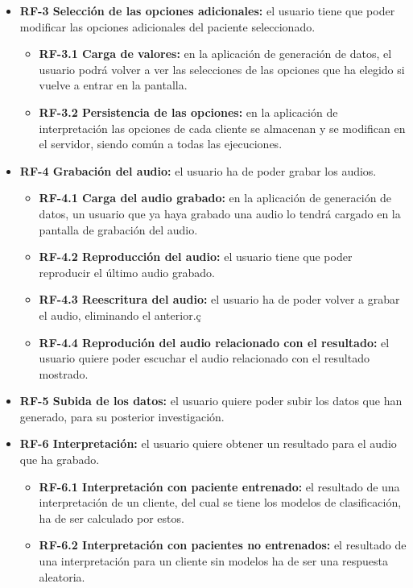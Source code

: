 \begin{itemize}
\begin{itemize}
	\end{itemize}
	\item \textbf{RF-3 Selección de las opciones adicionales:} el usuario tiene que poder modificar las opciones adicionales del paciente seleccionado.
	\begin{itemize}
		\item \textbf{RF-3.1 Carga de valores:} en la aplicación de generación de datos, el usuario podrá volver a ver las selecciones de las opciones que ha elegido si vuelve a entrar en la pantalla.
		\item \textbf{RF-3.2 Persistencia de las opciones:} en la aplicación de interpretación las opciones de cada cliente se almacenan y se modifican en el servidor, siendo común a todas las ejecuciones.
	\end{itemize}
	\item \textbf{RF-4 Grabación del audio:} el usuario ha de poder grabar los audios.
	\begin{itemize}
		\item \textbf{RF-4.1 Carga del audio grabado:} en la aplicación de generación de datos, un usuario que ya haya grabado una audio lo tendrá cargado en la pantalla de grabación del audio.
		\item \textbf{RF-4.2 Reproducción del audio:} el usuario tiene que poder reproducir el último audio grabado.
		\item \textbf{RF-4.3 Reescritura del audio:} el usuario ha de poder volver a grabar el audio, eliminando el anterior.ç
		\item \textbf{RF-4.4 Reprodución del audio relacionado con el resultado:} el usuario quiere poder escuchar el audio relacionado con el resultado mostrado.
	\end{itemize}
	\item \textbf{RF-5 Subida de los datos:} el usuario quiere poder subir los datos que han generado, para su posterior investigación.
	\item \textbf{RF-6 Interpretación:} el usuario quiere obtener un resultado para el audio que ha grabado.
	\begin{itemize}
		\item \textbf{RF-6.1 Interpretación con paciente entrenado:} el resultado de una interpretación de un cliente, del cual se tiene los modelos de clasificación, ha de ser calculado por estos.
		\item \textbf{RF-6.2 Interpretación con pacientes no entrenados:} el resultado de una interpretación para un cliente sin modelos ha de ser una respuesta aleatoria.

\end{itemize}
\end{itemize}
